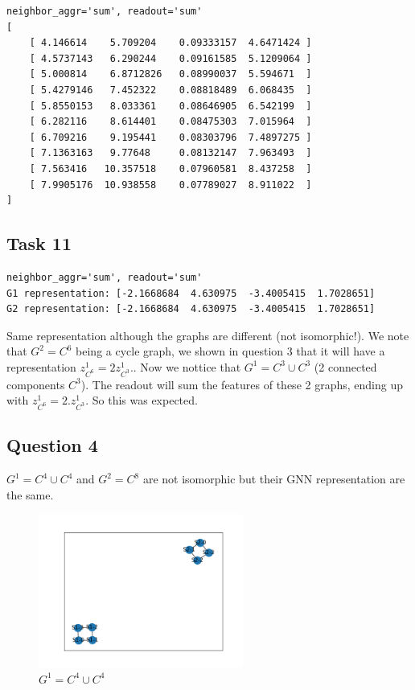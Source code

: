 \documentclass[a4paper]{article}
\begin{document}
\begin{verbatim}
neighbor_aggr='sum', readout='sum'
[
    [ 4.146614    5.709204    0.09333157  4.6471424 ]
    [ 4.5737143   6.290244    0.09161585  5.1209064 ]
    [ 5.000814    6.8712826   0.08990037  5.594671  ]
    [ 5.4279146   7.452322    0.08818489  6.068435  ]
    [ 5.8550153   8.033361    0.08646905  6.542199  ]
    [ 6.282116    8.614401    0.08475303  7.015964  ]
    [ 6.709216    9.195441    0.08303796  7.4897275 ]
    [ 7.1363163   9.77648     0.08132147  7.963493  ]
    [ 7.563416   10.357518    0.07960581  8.437258  ]
    [ 7.9905176  10.938558    0.07789027  8.911022  ]
]      
\end{verbatim}

\subsection*{Task 11}
\begin{verbatim}
neighbor_aggr='sum', readout='sum'
G1 representation: [-2.1668684  4.630975  -3.4005415  1.7028651]
G2 representation: [-2.1668684  4.630975  -3.4005415  1.7028651]
\end{verbatim}
Same representation although the graphs are different (not isomorphic!).
We note that $G^2 =C^6$ being a cycle graph, we shown in question 3 that it will have a representation $z^{1}_{C^6} = 2 z^{1}_{C^3}$..
Now we nottice that $G^{1} = C^3 \cup C^3$ (2 connected components $C^3$). The readout will sum the features of these 2 graphs,
ending up with $z^{1}_{C^6} = 2. z^{1}_{C^3}$.
So this was expected.


\subsection*{Question 4}
$G^1 =C^4 \cup C^4$ and $G^2 =C^8$ are not isomorphic but their GNN representation are the same.
\begin{figure}[ht]
    \centering
    \includegraphics[width=0.6\textwidth]{figures/C4_u_C4.png}
    \caption{$G^1 =C^4 \cup C^4$}
    \label{fig:c4_u_c4}
\end{figure}
\end{document}
